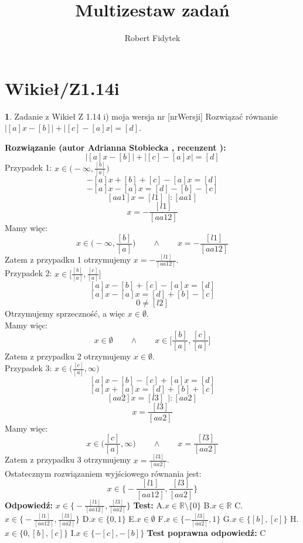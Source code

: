 \documentclass[12pt, a4paper]{article}
\title{Multizestaw zadań}
\author{Robert Fidytek}
\date{}
\theoremstyle{definition} %
\newtheorem{zad}{}
\newcommand{\kategoria}[1]{\section{#1}} %
\newcommand{\zadStart}[1]{\begin{zad}#1\newline} %
\newcommand{\zadStop}{\end{zad}}   %
\newcommand{\rozwStart}[2]{\noindent \textbf{Rozwiązanie (autor #1 , recenzent #2): }\newline} %
\newcommand{\rozwStop}{\newline}                                            %
\newcommand{\odpStart}{\noindent \textbf{Odpowiedź:}\newline}    %
\newcommand{\odpStop}{\newline}                                             %
\newcommand{\testStart}{\noindent \textbf{Test:}\newline} %
\newcommand{\testStop}{\newline} %
\newcommand{\kluczStart}{\noindent \textbf{Test poprawna odpowiedź:}\newline} %
\newcommand{\kluczStop}{\newline} %
\begin{document}
\maketitle


\kategoria{Wikieł/Z1.14i}
\zadStart{Zadanie z Wikieł Z 1.14 i) moja wersja nr [nrWersji]}
Rozwiązać równanie $|[a]x-[b]|+|[c]-[a]x|=[d]$.
\zadStop
\rozwStart{Adrianna Stobiecka}{}
$$|[a]x-[b]|+|[c]-[a]x|=[d]$$
Przypadek 1: $x\in\bigg(-\infty,\frac{[b]}{[a]}\bigg)$
$$-[a]x+[b]+[c]-[a]x=[d]$$
$$-[a]x-[a]x=[d]-[b]-[c]$$
$$[aa1]x=[l1]~~\bigg|:[aa1]$$
$$x=-\frac{[l1]}{[aa12]}$$
Mamy więc:
$$x\in\bigg(-\infty,\frac{[b]}{[a]}\bigg)\qquad\land\qquad x=-\frac{[l1]}{[aa12]}$$
Zatem z przypadku 1 otrzymujemy $x=-\frac{[l1]}{[aa12]}$.
\\Przypadek 2: $x\in\bigg[\frac{[b]}{[a]}, \frac{[c]}{[a]}\bigg]$
$$[a]x-[b]+[c]-[a]x=[d]$$
$$[a]x-[a]x=[d]+[b]-[c]$$
$$0\ne[l2]$$
Otrzymujemy sprzeczność, a więc $x\in\emptyset$.
\\Mamy więc:
$$x\in\emptyset\qquad\land\qquad x\in\bigg[\frac{[b]}{[a]}, \frac{[c]}{[a]}\bigg]$$
Zatem z przypadku 2 otrzymujemy $x\in\emptyset$.
\\Przypadek 3: $x\in\bigg(\frac{[c]}{[a]},\infty\bigg)$
$$[a]x-[b]-[c]+[a]x=[d]$$
$$[a]x+[a]x=[d]+[b]+[c]$$
$$[aa2]x=[l3]~~\bigg|:[aa2]$$
$$x=\frac{[l3]}{[aa2]}$$
Mamy więc:
$$x\in\bigg(\frac{[c]}{[a]},\infty\bigg)\qquad\land\qquad x=\frac{[l3]}{[aa2]}$$
Zatem z przypadku 3 otrzymujemy $x=\frac{[l3]}{[aa2]}$.
\\Ostatecznym rozwiązaniem wyjściowego równania jest:
$$x\in\bigg\{-\frac{[l1]}{[aa12]},\frac{[l3]}{[aa2]}\bigg\}$$
\rozwStop
\odpStart
$x\in\bigg\{-\frac{[l1]}{[aa12]},\frac{[l3]}{[aa2]}\bigg\}$
\odpStop
\testStart
A.$x\in\mathbb{R}\setminus\{0\}$
B.$x\in\mathbb{R}$
C.$x\in\bigg\{-\frac{[l1]}{[aa12]},\frac{[l3]}{[aa2]}\bigg\}$
D.$x\in\{0,1\}$
E.$x\in\emptyset$
F.$x\in\{-\frac{[l3]}{[aa2]},1\}$
G.$x\in\{[b],[c]\}$
H.$x\in\{0,[b],[c]\}$
I.$x\in\{-[c],-[b]\}$
\testStop
\kluczStart
C
\kluczStop
\end{document}
